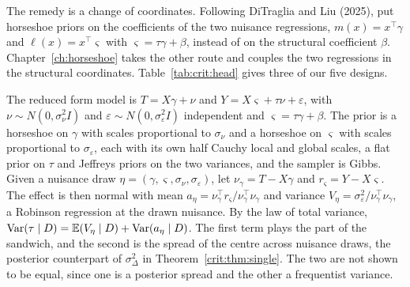 The remedy is a change of coordinates. Following DiTraglia and Liu (2025), put horseshoe priors on the coefficients of the two nuisance regressions, $m(x) = x^\top\gamma$ and $\ell(x) = x^\top\varsigma$ with $\varsigma = \tau\gamma + \beta$, instead of on the structural coefficient $\beta$. Chapter~\ref{ch:horseshoe} takes the other route and couples the two regressions in the structural coordinates. Table~\ref{tab:crit:head} gives three of our five designs.

The reduced form model is $T = X\gamma + \nu$ and $Y = X\varsigma + \tau\nu + \varepsilon$, with $\nu \sim N(0, \sigma_\nu^2 I)$ and $\varepsilon \sim N(0, \sigma_\varepsilon^2 I)$ independent and $\varsigma = \tau\gamma + \beta$. The prior is a horseshoe on $\gamma$ with scales proportional to $\sigma_\nu$ and a horseshoe on $\varsigma$ with scales proportional to $\sigma_\varepsilon$, each with its own half Cauchy local and global scales, a flat prior on $\tau$ and Jeffreys priors on the two variances, and the sampler is Gibbs. Given a nuisance draw $\eta = (\gamma, \varsigma, \sigma_\nu, \sigma_\varepsilon)$, let $\nu_\gamma = T - X\gamma$ and $r_\varsigma = Y - X\varsigma$. The effect is then normal with mean $a_\eta = \nu_\gamma^\top r_\varsigma/\nu_\gamma^\top\nu_\gamma$ and variance $V_\eta = \sigma_\varepsilon^2/\nu_\gamma^\top\nu_\gamma$, a Robinson regression at the drawn nuisance. By the law of total variance, $\mathrm{Var}(\tau \mid D) = \mathbb{E}(V_\eta \mid D) + \mathrm{Var}(a_\eta \mid D)$. The first term plays the part of the sandwich, and the second is the spread of the centre across nuisance draws, the posterior counterpart of $\sigma_\Delta^2$ in Theorem~\ref{crit:thm:single}. The two are not shown to be equal, since one is a posterior spread and the other a frequentist variance.

